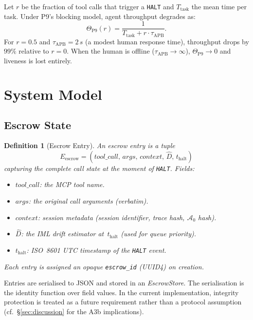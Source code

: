 \documentclass[11pt]{article}
\newtheorem{definition}{Definition}[section]
\newcommand{\Azero}{\mathcal{A}_0}
\newcommand{\Dhat}{\widehat{D}}
\newcommand{\HALT}{\texttt{HALT}}
\newcommand{\Eescrow}{E_{\mathrm{escrow}}}
\newcommand{\thalt}{t_{\mathrm{halt}}}
\begin{document}
Let $r$ be the fraction of tool calls that trigger a \HALT{} and
$T_{\mathrm{task}}$ the mean time per task. Under P9's blocking model,
agent throughput degrades as:
\[
  \Theta_{\mathrm{P9}}(r)
  = \frac{1}{T_{\mathrm{task}} + r \cdot \tau_{\mathrm{APB}}}.
\]
For $r = 0.5$ and $\tau_{\mathrm{APB}} = 2\,\si{s}$ (a modest human
response time), throughput drops by $99\%$ relative to $r=0$.
When the human is offline ($\tau_{\mathrm{APB}} \to \infty$),
$\Theta_{\mathrm{P9}} \to 0$ and liveness is lost entirely.

\section{System Model}
\label{sec:model}

\subsection{Escrow State}
\label{sec:escrow}

\begin{definition}[Escrow Entry]
An \emph{escrow entry} is a tuple
\[
  \Eescrow = (\mathit{tool\_call},\, \mathit{args},\, \mathit{context},\,
               \Dhat,\, \thalt)
\]
capturing the complete call state at the moment of \HALT{}. Fields:
\begin{itemize}[itemsep=1pt]
  \item $\mathit{tool\_call}$: the MCP tool name.
  \item $\mathit{args}$: the original call arguments (verbatim).
  \item $\mathit{context}$: session metadata (session identifier,
        trace hash, $\Azero$ hash).
  \item $\Dhat$: the IML drift estimator at~$\thalt$ (used for queue priority).
  \item $\thalt$: ISO~8601 UTC timestamp of the \HALT{} event.
\end{itemize}
Each entry is assigned an opaque \texttt{escrow\_id} (UUID4) on creation.
\end{definition}

Entries are serialised to JSON and stored in an \emph{EscrowStore}.
The serialisation is the identity function over field values.
In the current implementation, integrity protection is treated as a
future requirement rather than a protocol assumption
(cf.~\S\ref{sec:discussion} for the A3b implications).
\end{document}
